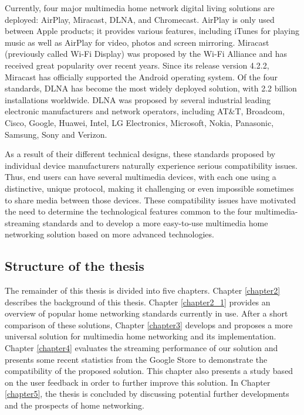 Currently, four major multimedia home network digital living solutions  are
deployed: AirPlay, Miracast, DLNA, and Chromecast. AirPlay is only used
between Apple products; it provides various features, including iTunes for
playing music as well as AirPlay for video, photos and screen mirroring.
Miracast (previously called Wi-Fi Display) was proposed by the Wi-Fi Alliance
and has received great popularity over recent years. Since its release version
4.2.2, Miracast has officially supported the Android operating system. Of the
four standards, DLNA has become the most widely deployed solution, with 2.2
billion installations worldwide. DLNA was proposed by several industrial
leading electronic manufacturers and network operators, including AT$\&$T,
Broadcom, Cisco, Google, Huawei, Intel, LG Electronics, Microsoft, Nokia,
Panasonic, Samsung, Sony and Verizon.

As a result of their different technical designs, these standards proposed by
individual device manufacturers naturally experience serious compatibility
issues. Thus, end users can have several multimedia devices, with each one
using a distinctive, unique protocol, making it challenging or even impossible
sometimes to share media between those devices. These compatibility issues have
motivated the need to determine the technological features common to the four
multimedia-streaming standards and to develop a more easy-to-use multimedia
home networking solution based on more advanced technologies.

\subsection{Structure of the thesis}
The remainder of this thesis is divided into five chapters. Chapter
\ref{chapter2} describes the background of this thesis. Chapter \ref{chapter2_1}
provides an overview of popular home networking standards currently in use.
After a short comparison of these solutions, Chapter \ref{chapter3} develops
and proposes a more universal solution for multimedia home networking and its
implementation.
Chapter \ref{chapter4} evaluates the streaming performance of our solution and
presents some recent statistics from the Google Store to demonstrate the
compatibility of the proposed solution. This chapter also presents a study
based on the user feedback in order to further improve this solution. In
Chapter \ref{chapter5}, the thesis is concluded by  discussing potential 
further developments and the prospects of home networking.